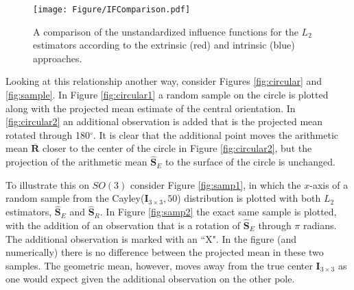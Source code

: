 \documentclass{article}\usepackage[]{graphicx}\usepackage[]{color}
\newcommand{\ProjMean}{{\widehat{\bm S}_{E}}}
\newcommand{\GeomMean}{{\widehat{\bm S}_{R}}}
\begin{document}
\begin{figure}
\begin{center}
\texttt{[image: Figure/IFComparison.pdf]}
\end{center}\vspace{-1em}
\caption{A comparison of the unstandardized influence functions for the $L_2$ estimators according to the extrinsic (red) and intrinsic (blue) approaches.}
\label{fig:IFs}
\end{figure} 
 
 
Looking at this relationship another way, consider Figures \ref{fig:circular} and \ref{fig:sample}.  In Figure \ref{fig:circular1} a random sample on the circle is plotted along with the projected mean estimate of the central orientation.  In \ref{fig:circular2} an additional observation is added that is the projected mean rotated through 180$^\circ$.  It is clear that the additional point moves the arithmetic mean $\overline{\bm R}$ closer to the center of the circle in Figure \ref{fig:circular2}, but the projection of the arithmetic mean $\ProjMean$ to the surface of the circle is unchanged.

To illustrate this on $SO(3)$ consider Figure \ref{fig:samp1}, in which the $x$-axis of a random sample from the Cayley($\bm I_{3\times 3},50$) distribution is plotted with both $L_2$ estimators, $\ProjMean$ and $\GeomMean$.  In Figure \ref{fig:samp2} the exact same sample is plotted, with the addition of an observation that is a rotation of $\ProjMean$ through $\pi$ radians.  The additional observation is marked with an ``X".  In the figure (and numerically) there is no difference between the projected mean in these two samples.  The geometric mean, however, moves away from the true center $\bm I_{3\times 3}$ as one would expect given the additional observation on the other pole.
\end{document}
